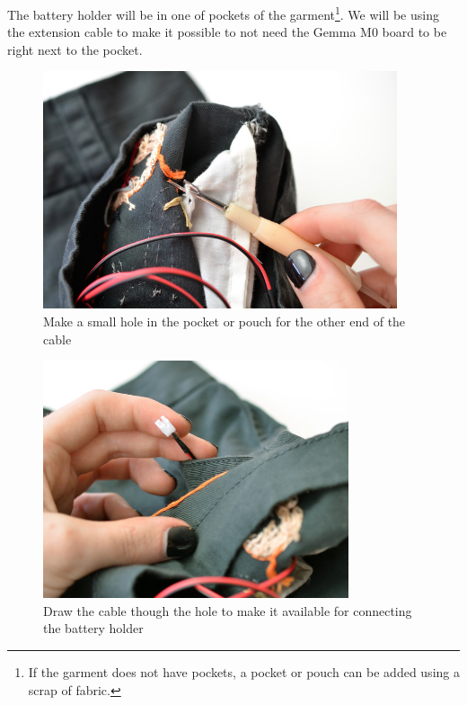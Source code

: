 \documentclass[letterpaper,twoside,12pt]{article}
\begin{document}
The battery holder will be in one of pockets of the garment\footnote{If the
garment does not have pockets, a pocket or pouch can be added using a scrap of
fabric.}. We will be using the extension cable to make it possible to not need 
the Gemma M0 board to be right next to the pocket.
\begin{figure}[hbpt]\begin{centering}%
\includegraphics[height=2.75in]{flora-angler-embroidery-30.jpg}
\caption{Make a small hole in the pocket or pouch for the other end of the cable}
\label{fig:flora-angler-embroidery-30}
\end{centering}\end{figure}
\begin{figure}[hbpt]\begin{centering}%
\includegraphics[height=2.75in]{flora-angler-embroidery-31.jpg}
\caption{Draw the cable though the hole to make it available for connecting 
the battery holder}
\label{fig:flora-angler-embroidery-31}
\end{centering}\end{figure}
\end{document}
